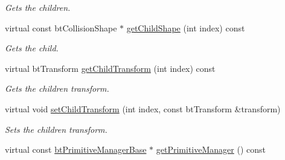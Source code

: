 \begin{CompactItemize}
\begin{CompactList}\small\item\em Gets the children. \item\end{CompactList}\item 
\hypertarget{classbt_g_impact_mesh_shape_part_dd9463d3616dec79a3bc4feace9683c3}{
virtual const btCollisionShape $\ast$ \hyperlink{classbt_g_impact_mesh_shape_part_dd9463d3616dec79a3bc4feace9683c3}{getChildShape} (int index) const }
\label{classbt_g_impact_mesh_shape_part_dd9463d3616dec79a3bc4feace9683c3}

\begin{CompactList}\small\item\em Gets the child. \item\end{CompactList}\item 
\hypertarget{classbt_g_impact_mesh_shape_part_6c4e647b0437ee898f8742d427de9181}{
virtual btTransform \hyperlink{classbt_g_impact_mesh_shape_part_6c4e647b0437ee898f8742d427de9181}{getChildTransform} (int index) const }
\label{classbt_g_impact_mesh_shape_part_6c4e647b0437ee898f8742d427de9181}

\begin{CompactList}\small\item\em Gets the children transform. \item\end{CompactList}\item 
virtual void \hyperlink{classbt_g_impact_mesh_shape_part_0a97d3769fb7d3f583e41da6b284bcc1}{setChildTransform} (int index, const btTransform \&transform)
\begin{CompactList}\small\item\em Sets the children transform. \item\end{CompactList}\item 
\hypertarget{classbt_g_impact_mesh_shape_part_195870142c61421252805a170fb978cf}{
virtual const \hyperlink{classbt_primitive_manager_base}{btPrimitiveManagerBase} $\ast$ \hyperlink{classbt_g_impact_mesh_shape_part_195870142c61421252805a170fb978cf}{getPrimitiveManager} () const }
\label{classbt_g_impact_mesh_shape_part_195870142c61421252805a170fb978cf}


\end{CompactItemize}
